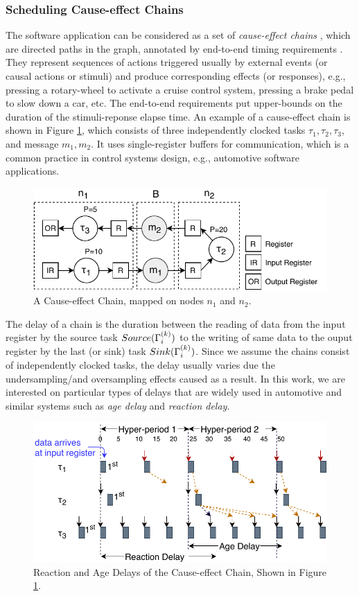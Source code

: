 \subsubsection{Scheduling Cause-effect Chains}\label{subsec_causeeffectchains}
The software application can be considered as a set of \textit{cause-effect chains} \sspExp{\Gamma}{\Gamma}, which are  directed paths in the graph, annotated by end-to-end timing requirements . They represent sequences of actions triggered usually by external events (or causal actions or stimuli) and produce corresponding effects (or responses), e.g.,  pressing a rotary-wheel to activate a cruise control system, pressing a brake pedal to slow down a car, etc. The end-to-end requirements put upper-bounds on the duration of the stimuli-reponse elapse time. An example of a cause-effect chain is shown in Figure \ref{fig_causeeffectchainntk}, which consists of three independently clocked tasks $\tau_1,\tau_2,\tau_3$, and message $m_1,m_2$. It uses single-register buffers for communication, which is a common practice in control systems design, e.g., automotive software applications.
\begin{figure}
	\centering
	\includegraphics[width=0.7\linewidth]{img/cause_effect_chain_ntk}
	\caption{A Cause-effect Chain, mapped on nodes $n_1$ and $n_2$.}
	\label{fig_causeeffectchainntk}
\end{figure}

The delay of a chain is the duration between the reading of data from the input register by the source task $Source(\sss{\Gamma})$ to the writing of same data to the ouput register by the last (or sink) task $Sink(\sss{\Gamma})$. Since we assume the chains consist of independently clocked tasks, the delay usually varies due the undersampling/and oversampling effects caused as a result. In this work, we are interested on particular types of delays that are widely used in automotive and similar systems such as \textit{age delay} and\textit{ reaction delay}. 
\begin{figure}
	\centering
	\includegraphics[width=0.9\linewidth]{img/timedchain_ntk}
	\caption{Reaction and Age Delays of the Cause-effect Chain, Shown in Figure {\ref{fig_causeeffectchainntk}}.}
	\label{fig_timedchainntk}
\end{figure}

